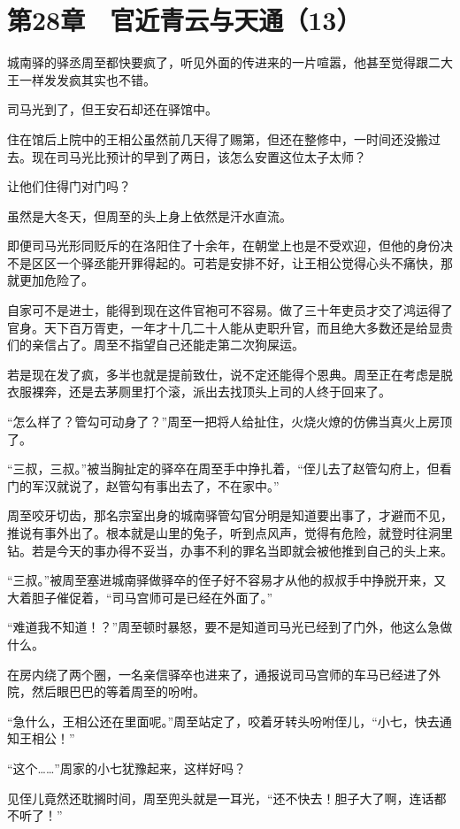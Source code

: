 \section{第28章　官近青云与天通（13）}

城南驿的驿丞周至都快要疯了，听见外面的传进来的一片喧嚣，他甚至觉得跟二大王一样发发疯其实也不错。

司马光到了，但王安石却还在驿馆中。

住在馆后上院中的王相公虽然前几天得了赐第，但还在整修中，一时间还没搬过去。现在司马光比预计的早到了两日，该怎么安置这位太子太师？

让他们住得门对门吗？

虽然是大冬天，但周至的头上身上依然是汗水直流。

即便司马光形同贬斥的在洛阳住了十余年，在朝堂上也是不受欢迎，但他的身份决不是区区一个驿丞能开罪得起的。可若是安排不好，让王相公觉得心头不痛快，那就更加危险了。

自家可不是进士，能得到现在这件官袍可不容易。做了三十年吏员才交了鸿运得了官身。天下百万胥吏，一年才十几二十人能从吏职升官，而且绝大多数还是给显贵们的亲信占了。周至不指望自己还能走第二次狗屎运。

若是现在发了疯，多半也就是提前致仕，说不定还能得个恩典。周至正在考虑是脱衣服裸奔，还是去茅厕里打个滚，派出去找顶头上司的人终于回来了。

“怎么样了？管勾可动身了？”周至一把将人给扯住，火烧火燎的仿佛当真火上房顶了。

“三叔，三叔。”被当胸扯定的驿卒在周至手中挣扎着，“侄儿去了赵管勾府上，但看门的军汉就说了，赵管勾有事出去了，不在家中。”

周至咬牙切齿，那名宗室出身的城南驿管勾官分明是知道要出事了，才避而不见，推说有事外出了。根本就是山里的兔子，听到点风声，觉得有危险，就登时往洞里钻。若是今天的事办得不妥当，办事不利的罪名当即就会被他推到自己的头上来。

“三叔。”被周至塞进城南驿做驿卒的侄子好不容易才从他的叔叔手中挣脱开来，又大着胆子催促着，“司马宫师可是已经在外面了。”

“难道我不知道！？”周至顿时暴怒，要不是知道司马光已经到了门外，他这么急做什么。

在房内绕了两个圈，一名亲信驿卒也进来了，通报说司马宫师的车马已经进了外院，然后眼巴巴的等着周至的吩咐。

“急什么，王相公还在里面呢。”周至站定了，咬着牙转头吩咐侄儿，“小七，快去通知王相公！”

“这个……”周家的小七犹豫起来，这样好吗？

见侄儿竟然还耽搁时间，周至兜头就是一耳光，“还不快去！胆子大了啊，连话都不听了！”

